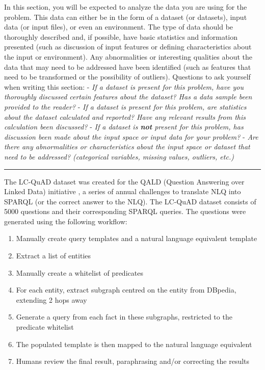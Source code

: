 \documentclass[12pt]{article}
\begin{document}
In this section, you will be expected to analyze the data you are using
for the problem. This data can either be in the form of a dataset (or
datasets), input data (or input files), or even an environment. The type
of data should be thoroughly described and, if possible, have basic
statistics and information presented (such as discussion of input
features or defining characteristics about the input or environment).
Any abnormalities or interesting qualities about the data that may need
to be addressed have been identified (such as features that need to be
transformed or the possibility of outliers). Questions to ask yourself
when writing this section: - \emph{If a dataset is present for this
problem, have you thoroughly discussed certain features about the
dataset? Has a data sample been provided to the reader?} - \emph{If a
dataset is present for this problem, are statistics about the dataset
calculated and reported? Have any relevant results from this calculation
been discussed?} - \emph{If a dataset is \textbf{not} present for this
problem, has discussion been made about the input space or input data
for your problem?} - \emph{Are there any abnormalities or
characteristics about the input space or dataset that need to be
addressed? (categorical variables, missing values, outliers, etc.)}

\begin{center}\rule{0.5\linewidth}{\linethickness}\end{center}

The LC-QuAD dataset \cite{trivedi2017lc} was created
for the QALD (Question Answering over Linked Data) initiative
\cite{QALD}, a series of annual challenges to translate NLQ into SPARQL
(or the correct answer to the NLQ). The LC-QuAD dataset consists of 5000
questions and their corresponding SPARQL queries. The questions were
generated using the following workflow:

\begin{enumerate}
\def\labelenumi{\arabic{enumi}.}
\item
  Manually create query templates and a natural language equivalent
  template
\item
  Extract a list of entities
\item
  Manually create a whitelist of predicates
\item
  For each entity, extract subgraph centred on the entity from DBpedia,
  extending 2 hops away
\item
  Generate a query from each fact in these subgraphs, restricted to the
  predicate whitelist
\item
  The populated template is then mapped to the natural language
  equivalent
\item
  Humans review the final result, paraphrasing and/or correcting the
  results
\end{enumerate}
\end{document}
